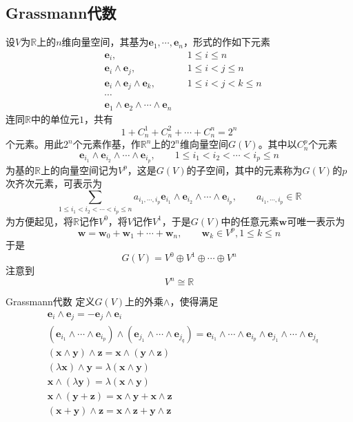 \documentclass[lang = cn, scheme = chinese, thmcnt = section]{elegantbook}
\newcommand{\R}{\mathbb{R}}            %
\newcommand{\bs}{\boldsymbol}          %
\begin{document}
\subsection{Grassmann代数}

设$V$为$\R$上的$n$维向量空间，其基为$\bs{e}_1,\cdots,\bs{e}_n$，形式的作如下元素
\begin{align*}
	& \bs{e}_i,&& 1\le i\le n\\
	& \bs{e}_i\wedge \bs{e}_j,&& 1\le i <j \le n\\
	& \bs{e}_i\wedge \bs{e}_j\wedge \bs{e}_k,&& 1\le i <j<k \le n\\
	& \cdots\\
	& \bs{e}_1\wedge \bs{e}_2\wedge\cdots \wedge \bs{e}_n
\end{align*}
连同$\R$中的单位元$1$，共有%
$$
1+C_n^1+C_n^2+\cdots+C_n^n=2^n
$$
个元素。用此$2^n$个元素作基，作$\R^n$上的$2^n$维向量空间$G(V)$。其中以$C_n^p$个元素%
$$
\bs{e}_{i_1}\wedge \bs{e}_{i_2}\wedge \cdots\wedge \bs{e}_{i_p},\qquad 1\le i_1<i_2<\cdots<i_p\le n
$$
为基的$\R$上的向量空间记为$V^p$，这是$G(V)$的子空间，其中的元素称为$G(V)$的$p$次齐次元素，可表示为%
$$
\sum_{1\le i_1<i_2<\cdots<i_p\le n}a_{i_1,\cdots,i_p}\bs{e}_{i_1}\wedge \bs{e}_{i_2}\wedge \cdots\wedge \bs{e}_{i_p},\qquad 
a_{i_1,\cdots,i_p}\in\R
$$
为方便起见，将$\R$记作$V^0$，将$V$记作$V^1$，于是$G(V)$中的任意元素$\bs{w}$可唯一表示为%
$$
\bs{w}=\bs{w}_0+\bs{w}_1+\cdots+\bs{w}_n,\qquad 
\bs{w}_k\in V^p,1\le k \le n
$$
于是%
$$
G(V)=V^0\oplus V^1\oplus \cdots\oplus V^n
$$
注意到%
$$
V^n\cong\R
$$

\begin{definition}{Grassmann代数}
	定义$G(V)$上的外乘$\wedge$，使得满足
	\begin{align*}
		& \bs{e}_i\wedge \bs{e}_j=-\bs{e}_j\wedge \bs{e}_i\\
		& (\bs{e}_{i_1}\wedge\cdots\wedge \bs{e}_{i_p})\wedge(\bs{e}_{j_1}\wedge\cdots\wedge \bs{e}_{j_q})=\bs{e}_{i_1}\wedge\cdots\wedge \bs{e}_{i_p}\wedge\bs{e}_{j_1}\wedge\cdots\wedge \bs{e}_{j_q}\\
		& (\bs{x}\wedge\bs{y})\wedge\bs{z}=\bs{x}\wedge(\bs{y}\wedge\bs{z})\\
		& (\lambda\bs{x})\wedge\bs{y}=\lambda(\bs{x}\wedge\bs{y})\\
		& \bs{x}\wedge(\lambda\bs{y})=\lambda(\bs{x}\wedge\bs{y})\\
		& \bs{x}\wedge(\bs{y}+\bs{z})=\bs{x}\wedge\bs{y}+\bs{x}\wedge\bs{z}\\
		& (\bs{x}+\bs{y})\wedge\bs{z}=\bs{x}\wedge\bs{z}+\bs{y}\wedge\bs{z}
	\end{align*}
\end{definition}
\end{document}
